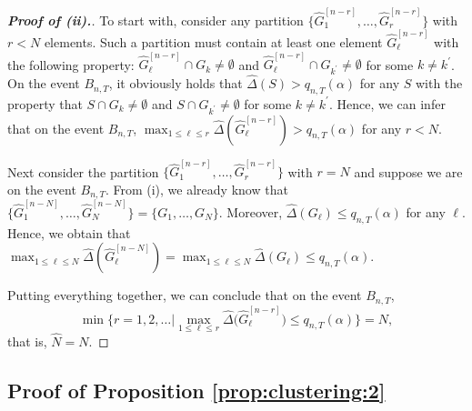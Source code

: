 \documentclass[12pt]{article}
\begin{document}
\begin{proof}[\textnormal{\textbf{Proof of (ii).}}]
To start with, consider any partition $\{ \widehat{G}_1^{[n-r]},\ldots,\widehat{G}_r^{[n-r]} \}$ with $r < N$ elements. Such a partition must contain at least one element $\widehat{G}_\ell^{[n-r]}$ with the following property: $\widehat{G}_\ell^{[n-r]} \cap G_k \ne \emptyset$ and $\widehat{G}_\ell^{[n-r]} \cap G_{k^\prime} \ne \emptyset$ for some $k \ne k^\prime$. On the event $B_{n,T}$, it obviously holds that $\widehat{\Delta}(S) > q_{n,T}(\alpha)$ for any $S$ with the property that $S \cap G_k \ne \emptyset$ and $S \cap G_{k^\prime} \ne \emptyset$ for some $k \ne k^\prime$. Hence, we can infer that on the event $B_{n,T}$, $\max_{1 \le \ell \le r} \widehat{\Delta} ( \widehat{G}_\ell^{[n-r]} ) > q_{n,T}(\alpha)$ for any $r < N$. 

Next consider the partition $\{ \widehat{G}_1^{[n-r]},\ldots,\widehat{G}_r^{[n-r]} \}$ with $r = N$ and suppose we are on the event $B_{n,T}$. From (i), we already know that $\{ \widehat{G}_1^{[n-N]},\ldots,\widehat{G}_N^{[n-N]} \} =\{ G_1,\ldots,G_N \}$. Moreover, $\widehat{\Delta}(G_\ell) \le q_{n,T}(\alpha)$ for any $\ell$. Hence, we obtain that $\max_{1 \le \ell \le N} \widehat{\Delta} ( \widehat{G}_\ell^{[n-N]} ) = \max_{1 \le \ell \le N} \widehat{\Delta} (G_\ell) \le q_{n,T}(\alpha)$.

Putting everything together, we can conclude that on the event $B_{n,T}$, 
\[ \min \Big\{ r = 1,2,\ldots \Big| \max_{1 \le \ell \le r} \widehat{\Delta} \big( \widehat{G}_\ell^{[n-r]} \big) \le q_{n,T}(\alpha) \Big\} = N, \]
that is, $\widehat{N} = N$. 
\end{proof}

\pagebreak
\subsection*{Proof of Proposition \ref{prop:clustering:2}}
\end{document}

